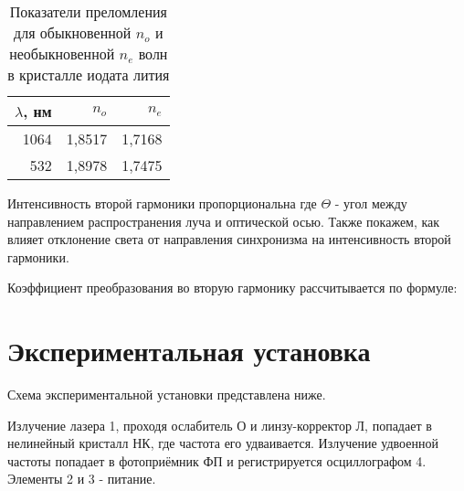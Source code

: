 \begin{table}[H]
\centering
\begin{tabular}{|r||r|r|}
\hline
$\lambda$, нм & $n_o$ & $n_e$ \\ \hline \hline
1064   & 1,8517 & 1,7168 \\ \hline
532    & 1,8978 & 1,7475 \\ \hline
\end{tabular}
\caption{Показатели преломления для обыкновенной $n_o$ и необыкновенной $n_e$ волн в кристалле иодата лития}
\end{table}
\n
Интенсивность второй гармоники пропорциональна
\n
где $\Theta$ - угол между направлением  распространения луча и оптической осью.
\n\n
Также покажем, как влияет отклонение света от направления синхронизма на интенсивность второй гармоники.
\n\n

\n
Коэффициент преобразования во вторую гармонику рассчитывается по формуле:

\section*{Экспериментальная установка}
Схема экспериментальной установки представлена ниже.

Излучение лазера 1, проходя ослабитель О и линзу-корректор Л, попадает в нелинейный кристалл НК, где частота его удваивается. Излучение удвоенной частоты попадает в фотоприёмник ФП и регистрируется осциллографом 4. Элементы 2 и 3 - питание.
